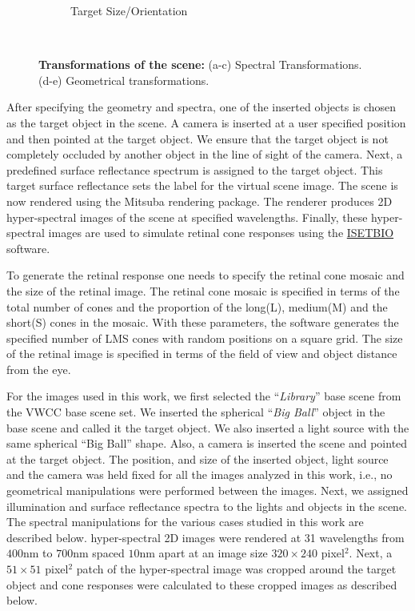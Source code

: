\documentclass{jov}
\begin{document}
\begin{figure}
\begin{subfigure}[b]{0.18 \textwidth}
        \caption{Target Size/Orientation}
        \label{fig:targetSizeOrientation}
    \end{subfigure}
    ~ %
    \caption{{\bf Transformations of the scene:} (a-c) Spectral Transformations. (d-e) Geometrical transformations.}\label{fig:spectralTransformations}
\end{figure}

After specifying the geometry and spectra, one of the inserted objects is chosen as the target object in the scene. A camera is inserted at a user specified position and then pointed at the target object. We ensure that the target object is not completely occluded by another object in the line of sight of the camera. Next, a predefined surface reflectance spectrum is assigned to the target object. This target surface reflectance sets the label for the virtual scene image. The scene is now rendered using the Mitsuba rendering package. The renderer produces 2D hyper-spectral images of the scene at specified wavelengths. Finally, these hyper-spectral images are used to simulate retinal cone responses using the \href{https://github.com/isetbio}{ISETBIO} software.

To generate the retinal response one needs to specify the retinal cone mosaic and the size of the retinal image. The retinal cone mosaic is specified in terms of the total number of cones and the proportion of the long(L), medium(M) and the short(S) cones in the mosaic. With these parameters, the software generates the specified number of LMS cones with random positions on a square grid. The size of the retinal image is specified in terms of the field of view and object distance from the eye. 

For the images used in this work, we first selected the ``{\it Library}'' base scene from the VWCC base scene set. We inserted the spherical ``{\it Big Ball}'' object in the base scene and called it the target object. We also inserted a light source with the same spherical ``Big Ball'' shape. Also, a camera is inserted the scene and pointed at the target object. The position, and size of the inserted object, light source and the camera was held fixed for all the images analyzed in this work, i.e., no geometrical manipulations were performed between the images. Next, we assigned illumination and surface reflectance spectra to the lights and objects in the scene. The spectral manipulations for the various cases studied in this work are described below. hyper-spectral 2D images were rendered at 31 wavelengths from $400$nm to $700$nm spaced $10$nm apart at an image size $320\times 240$ pixel$^2$. Next, a $51 \times 51$ pixel$^2$ patch of the hyper-spectral image was cropped around the target object and cone responses were calculated to these cropped images as described below.
\end{document}
